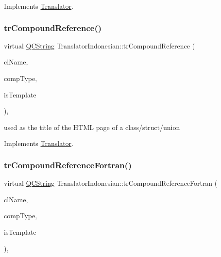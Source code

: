 Implements \mbox{\hyperlink{class_translator}{Translator}}.

\mbox{\label{class_translator_indonesian_a5aedd6aa22876450e64ae79fc0d74440}} 
\subsubsection{\texorpdfstring{trCompoundReference()}{trCompoundReference()}}
{\footnotesize\ttfamily virtual \mbox{\hyperlink{class_q_c_string}{Q\+C\+String}} Translator\+Indonesian\+::tr\+Compound\+Reference (\begin{DoxyParamCaption}\item[{const char $\ast$}]{cl\+Name,  }\item[{\mbox{\hyperlink{class_class_def_ae70cf86d35fe954a94c566fbcfc87939}{Class\+Def\+::\+Compound\+Type}}}]{comp\+Type,  }\item[{bool}]{is\+Template }\end{DoxyParamCaption})\hspace{0.3cm}{\ttfamily [inline]}, {\ttfamily [virtual]}}

used as the title of the H\+T\+ML page of a class/struct/union 

Implements \mbox{\hyperlink{class_translator}{Translator}}.

\mbox{\label{class_translator_indonesian_a89d985294f4a1a65bc1e74a7a3908455}} 
\subsubsection{\texorpdfstring{trCompoundReferenceFortran()}{trCompoundReferenceFortran()}}
{\footnotesize\ttfamily virtual \mbox{\hyperlink{class_q_c_string}{Q\+C\+String}} Translator\+Indonesian\+::tr\+Compound\+Reference\+Fortran (\begin{DoxyParamCaption}\item[{const char $\ast$}]{cl\+Name,  }\item[{\mbox{\hyperlink{class_class_def_ae70cf86d35fe954a94c566fbcfc87939}{Class\+Def\+::\+Compound\+Type}}}]{comp\+Type,  }\item[{bool}]{is\+Template }\end{DoxyParamCaption})\hspace{0.3cm}{\ttfamily [inline]}, {\ttfamily [virtual]}}

